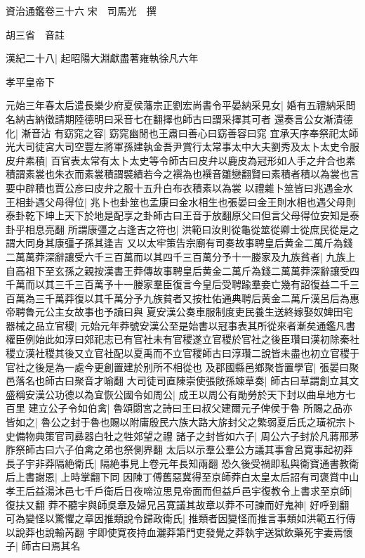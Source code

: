 資治通鑑卷三十六
宋　司馬光　撰

胡三省　音註

漢紀二十八|{
	起昭陽大淵獻盡著雍執徐凡六年}


孝平皇帝下

元始三年春太后遣長樂少府夏侯藩宗正劉宏尚書令平晏納采見女|{
	婚有五禮納采問名納吉納徵請期陸德明曰采音七在翻擇也師古曰謂采擇其可者}
還奏言公女漸漬德化|{
	漸音沾}
有窈窕之容|{
	窈窕幽閒也王肅曰善心曰窈善容曰窕}
宜承天序奉祭祀太師光大司徒宮大司空豐左將軍孫建執金吾尹賞行太常事太中大夫劉秀及太卜太史令服皮弁素積|{
	百官表太常有太卜太史等令師古曰皮弁以鹿皮為冠形如人手之弁合也素積謂素裳也朱衣而素裳積謂襞績若今之襈為也襈音雛戀翻賢曰素積者積以為裳也言要中辟積也賈公彦曰皮弁之服十五升白布衣積素以為裳}
以禮雜卜筮皆曰兆遇金水王相卦遇父母得位|{
	兆卜也卦筮也孟康曰金水相生也張晏曰金王則水相也遇父母則泰卦乾下坤上天下於地是配享之卦師古曰王音于放翻原父曰但言父母得位安知是泰卦乎相息亮翻}
所謂康彊之占逢吉之符也|{
	洪範曰汝則從龜從筮從卿士從庶民從是之謂大同身其康彊子孫其逢吉}
又以太牢策告宗廟有司奏故事聘皇后黄金二萬斤為錢二萬萬莽深辭讓受六千三百萬而以其四千三百萬分予十一媵家及九族貧者|{
	九族上自高祖下至玄孫之親按漢書王莽傳故事聘皇后黄金二萬斤為錢二萬萬莽深辭讓受四千萬而以其三千三百萬予十一媵家羣臣復言今皇后受聘踰羣妾亡幾有詔復益二千三百萬為三千萬莽復以其千萬分予九族貧者又按杜佑通典聘后黄金二萬斤漢呂后為惠帝聘魯元公主女故事也予讀曰與}
夏安漢公奏車服制度吏民養生送終嫁娶奴婢田宅器械之品立官稷|{
	元始元年莽號安漢公至是始書以冠事表其所從來者漸矣通鑑凡書權臣例始此如淳曰郊祀志已有官社未有官稷遂立官稷於官社之後臣瓚曰漢初除秦社稷立漢社稷其後又立官社配以夏禹而不立官稷師古曰淳瓚二說皆未盡也初立官稷于官社之後是為一處今更創置建於别所不相從也}
及郡國縣邑鄉聚皆置學官|{
	張晏曰聚邑落名也師古曰聚音才喻翻}
大司徒司直陳崇使張敞孫竦草奏|{
	師古曰草謂創立其文}
盛稱安漢公功德以為宜恢公國令如周公|{
	成王以周公有勛勞於天下封以曲阜地方七百里}
建立公子令如伯禽|{
	魯頌閟宮之詩曰王曰叔父建爾元子俾侯于魯}
所賜之品亦皆如之|{
	魯公之封于魯也賜以附庸殷民六族大路大旂封父之繁弱夏后氏之璜祝宗卜史備物典策官司彞器白牡之牲郊望之禮}
諸子之封皆如六子|{
	周公六子封於凡蔣邢茅胙祭師古曰六子伯禽之弟也祭側界翻}
太后以示羣公羣公方議其事會呂寛事起初莽長子宇非莽隔絶衛氏|{
	隔絶事見上卷元年長知兩翻}
恐久後受禍即私與衛寶通書教衛后上書謝恩|{
	上時掌翻下同}
因陳丁傅舊惡冀得至京師莽白太皇太后詔有司褒賞中山孝王后益湯沐邑七千戶衛后日夜啼泣思見帝面而但益戶邑宇復教令上書求至京師|{
	復扶又翻}
莽不聽宇與師吳章及婦兄呂寛議其故章以莽不可諫而好鬼神|{
	好呼到翻}
可為變怪以驚懼之章因推類說令歸政衛氏|{
	推類者因變怪而推言事類如洪範五行傳以說莽也說輸芮翻}
宇即使寛夜持血灑莽第門吏發覺之莽執宇送獄飲藥死宇妻焉懷子|{
	師古曰焉其名}
